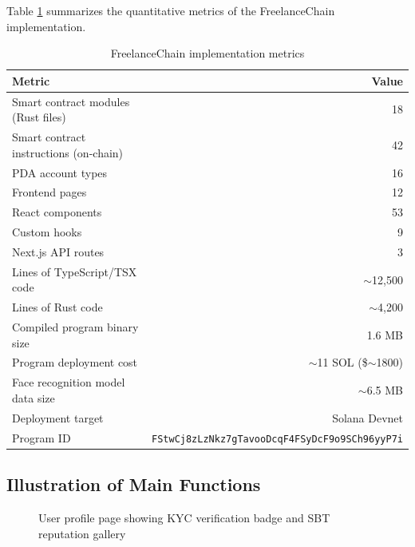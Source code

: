 Table \ref{table:achievement} summarizes the quantitative metrics of the FreelanceChain implementation.

\begin{table}[H]
\centering
\caption{FreelanceChain implementation metrics}
\label{table:achievement}
\begin{tabular}{|l|r|}
\hline
\textbf{Metric} & \textbf{Value} \\ \hline
Smart contract modules (Rust files) & 18 \\ \hline
Smart contract instructions (on-chain) & 42 \\ \hline
PDA account types & 16 \\ \hline
Frontend pages & 12 \\ \hline
React components & 53 \\ \hline
Custom hooks & 9 \\ \hline
Next.js API routes & 3 \\ \hline
Lines of TypeScript/TSX code & $\sim$12,500 \\ \hline
Lines of Rust code & $\sim$4,200 \\ \hline
Compiled program binary size & 1.6 MB \\ \hline
Program deployment cost & ${\sim}$11 SOL (\$${\sim}$1800) \\ \hline
Face recognition model data size & $\sim$6.5 MB \\ \hline
Deployment target & Solana Devnet \\ \hline
Program ID & \texttt{FStwCj8zLzNkz7gTavooDcqF4FSyDcF9o9SCh96yyP7i} \\ \hline
\end{tabular}
\end{table}

\subsection{Illustration of Main Functions}
\label{subsection:4.3.3}

\begin{figure}[H]
    \centering
    \caption{User profile page showing KYC verification badge and SBT reputation gallery}
    \label{fig:profile}
\end{figure}

